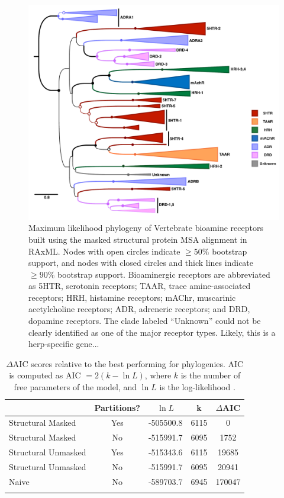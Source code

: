 \documentclass[fleqn,10pt]{wlpeerj}
\begin{document}
\newpage


\begin{figure}[htbp]
	\centerline{\includegraphics[width=18cm]{figures/masked_part_phylogeny.pdf}}
	\caption{\label{phylogeny} Maximum likelihood phylogeny of Vertebrate bioamine receptors built using the masked structural protein MSA alignment in RAxML. Nodes with open circles indicate $\geq 50\%$ bootstrap support, and nodes with closed circles and thick lines indicate $\geq 90\%$ bootstrap support. Bioaminergic receptors are abbreviated as 5HTR, serotonin receptors; TAAR, trace amine-associated receptors; HRH, histamine receptors; mAChr, muscarinic acetylcholine receptors; ADR, adreneric receptors; and DRD, dopamine receptors. The clade labeled ``Unknown'' could not be clearly identified as one of the major receptor types. Likely, this is a herp-specific gene...}
\end{figure}

\newpage

\begin{table}[htbp]
	\centering
	\begin{tabular}{l c l l c}
		\hline\noalign{\smallskip}
		\multicolumn{1}{c}{Alignment} & \multicolumn{1}{c}{Partitions?} & \multicolumn{1}{c}{$\ln L$} & \multicolumn{1}{c}{k} & \multicolumn{1}{l}{$\Delta$AIC} \\
		\hline\noalign{\smallskip}
		Structural Masked & Yes & -505500.8 & 6115 & 0 \\
		Structural Masked & No & -515991.7 & 6095 & 1752 \\  
		Structural Unmasked & Yes & -515343.6 & 6115 & 19685 \\
		Structural Unmasked & No & -515991.7 & 6095 & 20941 \\ 
		Naive & No &  -589703.7 & 6945 & 170047 \\
		\noalign{\smallskip}\hline\noalign{\smallskip} 
	\end{tabular}
	\caption{\label{tab:phylo_AIC} $\Delta$AIC scores relative to the best performing for phylogenies.  AIC is computed as AIC $= 2(k - \ln L)$, where $k$ is the number of free parameters of the model, and $\ln L$ is the log-likelihood \citep{Akaike1974,BurnhamAnderson2004}.}
\end{table}
\end{document}
